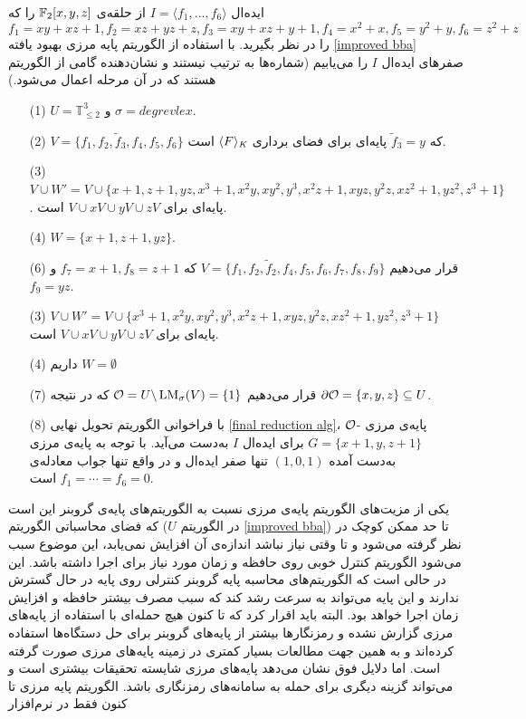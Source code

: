 \begin{example}
\label{example:BBasis}
ایده‌ال 
$I = \langle f_{1},...,f_{6}\rangle $
از حلقه‌ی 
$\mathbb{F}_{2}[x,y,z]$
را که 
\begin{equation*}
f_{1} = xy + xz + 1, f_{2} = xz + yz + z, f_{3} = xy + xz + y + 1, f_{4} = x^{2} + x, f_{5} = y^{2} + y, f_{6} = z^{2} + z
\end{equation*}
را در نظر بگیرید. با استفاده از الگوریتم پایه‌  مرزی بهبود یافته 
\ref{improved bba}
صفرهای ایده‌ال 
$I$
را می‌یابیم (شماره‌ها به ترتیب نیستند و نشان‌دهنده گامی از الگوریتم هستند که در آن مرحله اعمال می‌شود.)
\begin{enumerate}
\item[(1)]
$U = \mathbb{T}_{\leq 2}^{3}$
و 
$\sigma = degrevlex$.
\item[(2)]
$V = \{f_{1},f_{2},\tilde{f}_{3}, f_{4}, f_{5}, f_{6}\}$
که 
$\tilde{f}_{3} = y$
پایه‌ای برای فضای برداری 
$\langle F \rangle_{\textit{K}}$
است. 
\item[(3)]
$V\cup W' = V\cup \{x+1, z+1, yz, x^{3} + 1, x^{2}y, xy^{2}, y^{3}, x^{2}z + 1, xyz, y^{2}z, xz^{2}+1, yz^{2}, z^{3}+1\}$.
پایه‌ای برای 
$V\cup xV\cup yV\cup zV$
است.
\item[(4)]
$W = \{x + 1, z + 1, yz\}$.
\item[(6)]
قرار می‌دهیم 
$V = \{f_{1}, f_{2}, \tilde{f}_{2}, f_{4}, f_{5}, f_{6}, f_{7}, f_{8}, f_{9}\}$
که 
$f_{7} = x + 1,  f_{8} = z + 1$
و
$f_{9} = yz$.
\item[(3)]
{\small $V\cup W' = V\cup \{x^{3} + 1, x^{2}y, xy^{2}, y^{3}, x^{2}z + 1, xyz, y^{2}z, xz^{2}+ 1, yz^{2}, z^{3} + 1\}$}
پایه‌ای برای 
$V\cup xV\cup yV\cup zV$
است. 
\item[(4)]
داریم 
$W = \emptyset$
\item[(7)]
قرار می‌دهیم 
${\mathcal O} = U\backslash \operatorname{\mathrm{LM}}_{\sigma}(V) = \{1\}$
که در نتیجه 
$\partial\mathcal{O} = \{x, y, z\}\subseteq U$.
\item[(8)]
با فراخوانی الگوریتم تحویل نهایی 
\ref{final reduction alg}،
${\mathcal O}$-
پایه‌ی مرزی 
$G = \{x + 1, y, z + 1\}$
برای ایده‌ال 
$I$
به‌دست  می‌آید. 
\noindent
با توجه به پایه‌ی مرزی به‌دست آمده 
$(1,0,1)$
تنها صفر ایده‌ال و در واقع تنها جواب معادله‌ی 
$f_{1} = \cdots  = f_{6} = 0$
است. 
\end{enumerate}
\end{example}
یکی از مزیت‌های الگوریتم پایه‌ی مرزی نسبت به الگوریتم‌های پایه‌ی گروبنر این است که فضای محاسباتی الگوریتم ($U$ در الگوریتم 
\ref{improved bba})
تا حد ممکن کوچک در نظر گرفته می‌شود و تا وقتی نیاز نباشد اندازه‌ی آن افزایش نمی‌یابد، این موضوع سبب می‌شود الگوریتم کنترل خوبی روی حافظه‌ و زمان مورد نیاز برای اجرا داشته باشد. این در حالی است که الگوریتم‌های محاسبه پایه‌  گروبنر کنترلی روی پایه‌  در حال گسترش ندارند و این پایه‌ می‌تواند به سرعت رشد کند که سبب مصرف بیشتر حافظه و افزایش زمان اجرا خواهد بود. البته باید اقرار کرد که تا کنون هیچ حمله‌ای با استفاده از پایه‌های مرزی گزارش نشده و رمزنگارها بیشتر از پایه‌های گروبنر برای حل دستگاه‌ها استفاده کرده‌اند و به همین جهت مطالعات بسیار کمتری در زمینه پایه‌های مرزی صورت گرفته است. اما دلایل فوق نشان می‌دهد پایه‌های مرزی شایسته‌  تحقیقات بیشتری است و می‌تواند گزینه‌  دیگری برای حمله به سامانه‌های رمزنگاری باشد.  الگوریتم پایه‌  مرزی تا کنون فقط در نرم‌افزار 
